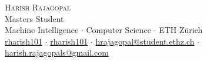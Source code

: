 \newcommand{\sep}{$\cdot$}%
\newcommand{\gmail}{harish.rajagopals@gmail.com}
\newcommand{\ethzmail}{hrajagopal@student.ethz.ch}

\begin{center}

\textsc{\huge Harish Rajagopal}\\[2mm]
Masters Student\\[1mm]
Machine Intelligence \sep{} Computer Science \sep{} ETH Zürich\\[1mm]
\faGithub{} \href{https://github.com/rharish101}{rharish101} \sep{}
\faLinkedin{} \href{https://www.linkedin.com/in/rharish101/}{rharish101} \sep{}
\faEnvelope{} \href{mailto:\ethzmail}{\ethzmail} \sep{}
\faEnvelope{} \href{mailto:\gmail}{\gmail}

\end{center}
